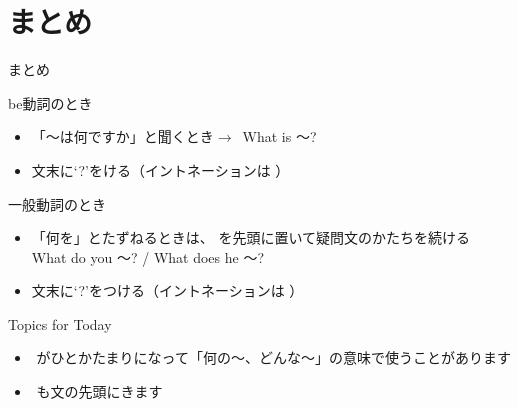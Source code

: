 \documentclass[aspectratio=169,xcolor={dvipsnames,table}]{beamer}
\begin{document}
\section{まとめ}
\begin{frame}[plain]{まとめ}

\begin{exampleblock}{be動詞のとき}
\begin{itemize}[square]\small
 \item 「〜は何ですか」と聞くとき$\longrightarrow$\,\,\,What is 〜?
 \item   文末に`?'をける（イントネーションは\myDownwardPitch{}\,\,）
\end{itemize}
     \end{exampleblock}

\begin{exampleblock}{一般動詞のとき}
\begin{itemize}[square]\small
 \item 「何を」とたずねるときは、\,\,を先頭に置いて疑問文のかたちを続ける\\
\hfill{}What do you  〜? / What does he 〜?
 \item   文末に`?'をつける（イントネーションは\myDownwardPitch{}\,\,）
\end{itemize}
     \end{exampleblock}

\begin{exampleblock}{Topics for Today}
\begin{itemize}\small
 \item {}\,\,がひとかたまりになって「何の〜、どんな～」の意味で使うことがあります
 \item {}\,\,も文の先頭にきます
\end{itemize}
     \end{exampleblock}
\end{frame}
\end{document}
